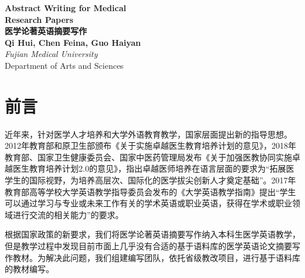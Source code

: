 \documentclass[a4paper]{ctexbook}
\begin{document}
\begin{titlepage}
    \begin{center}
      {\huge\bfseries Abstract Writing for Medical \\\vspace{3pt} Research Papers}\\[3ex]
      {\huge\bfseries 医学论著英语摘要写作}\\[6.5ex]
      {\large\bfseries Qi Hui, Chen Feina, Guo Haiyan}           \\
      \vspace{4ex}
      \textit{Fujian Medical University}                \\[2cm]


      \vfill
      Department of Arts and Sciences\\
      \vfill
      \date{}
    \end{center}
\end{titlepage}

\frontmatter
\chapter*{前言}

近年来，针对医学人才培养和大学外语教育教学，国家层面提出新的指导思想。2012年教育部和原卫生部颁布《关于实施卓越医生教育培养计划的意见》，2018年教育部、国家卫生健康委员会、国家中医药管理局发布《关于加强医教协同实施卓越医生教育培养计划2.0的意见》，指出卓越医师培养在语言层面的要求为“拓展医学生的国际视野，为培养高层次、国际化的医学拔尖创新人才奠定基础”。2017年教育部高等学校大学英语教学指导委员会发布的《大学英语教学指南》提出“学生可以通过学习与专业或未来工作有关的学术英语或职业英语，获得在学术或职业领域进行交流的相关能力”的要求。

根据国家政策的新要求，我们将医学论著英语摘要写作纳入本科生医学英语教学，但是教学过程中发现目前市面上几乎没有合适的基于语料库的医学英语论文摘要写作教材。为解决此问题，我们组建编写团队，依托省级教改项目，进行基于语料库的教材编写。
\end{document}
